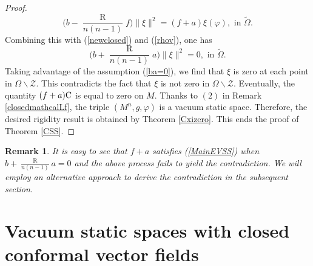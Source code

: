 \documentclass[10pt,leqno,oneside]{amsart}
\newtheorem{Rmk}{Remark}
\begin{document}
{\begin{proof}
       \[\Big(b-\frac{\operatorname R}{n(n-1)}f\Big)\|\xi\|^2=(f+a)\xi(\varphi),\text{~in~} \widetilde{\Omega}.\]
       Combining this with (\ref{newclosed}) and (\ref{rhov}), one has
       \[\Big(b+\frac{\operatorname R}{n(n-1)}a\Big)\|\xi\|^2=0,\text{~in~} \widetilde{\Omega}.\]
       Taking advantage of the assumption (\ref{ba=0}), we find that $\xi$ is zero at each point in $\Omega\backslash \mathcal{Z}.$ This contradicts the fact that $\xi$ is not zero in $\Omega\backslash \mathcal{Z}.$ Eventually, the quantity $(f+a){\rm C}$ is equal to zero on $M.$ Thanks to $(2)$ in Remark \ref{closedmathcalLf}, the triple $(M^n, g, \varphi)$ is a vacuum static space. Therefore, the desired rigidity result is obtained by Theorem \ref{Cxizero}. This ends the proof of Theorem \ref{CSS}.
    \end{proof}
    \begin{Rmk}
        It is easy to see that $f+a$ satisfies {\rm(\ref{MainEVSS})} when $b+\frac{\operatorname R}{n(n-1)}a=0$ and the above process fails to yield the contradiction. We will employ an alternative approach to derive the contradiction in the subsequent section.
    \end{Rmk}


\section{Vacuum static spaces with closed conformal vector fields}

}
\end{document}
